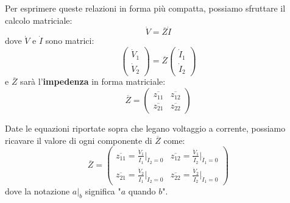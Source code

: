 \documentclass[a4paper,11pt]{article}
\begin{document}
Per esprimere queste relazioni in forma più compatta, possiamo sfruttare il calcolo matriciale:
$$
\dot{V} = \overline{Z} \dot{I}
$$
dove $\dot{V}$ e $\dot{I}$ sono matrici:
$$
\begin{pmatrix}
	\dot{V}_1 \\ \dot{V}_2
\end{pmatrix}
= \overline{Z}
\begin{pmatrix}
	\dot{I}_1 \\ \dot{I}_2
\end{pmatrix}
$$
e $\overline{Z}$ sarà l'\textbf{impedenza} in forma matriciale:
$$
\overline{Z} =
\begin{pmatrix}
	\overline{z_{11}} & \overline{z_{12}} \\ 
	\overline{z_{21}} & \overline{z_{22}} 
\end{pmatrix}
$$

Date le equazioni riportate sopra che legano voltaggio a corrente, possiamo ricavare il valore di ogni componente di $\overline{Z}$ come:
$$
\overline{Z} =
\begin{pmatrix}
	\overline{z_{11}} = \frac{\dot{V}_1}{\dot{I}_1} \Big|_{\dot{I}_2 = 0} & 
	\overline{z_{12}} = \frac{\dot{V}_1}{\dot{I}_2} \Big|_{\dot{I}_1 = 0} \\
	\overline{z_{21}} = \frac{\dot{V}_2}{\dot{I}_1} \Big|_{\dot{I}_2 = 0} &
	\overline{z_{22}} = \frac{\dot{V}_2}{\dot{I}_2} \Big|_{\dot{I}_1 = 0}
\end{pmatrix}
$$
dove la notazione $a \Big|_b$ significa "$a$ quando $b$".
\end{document}
